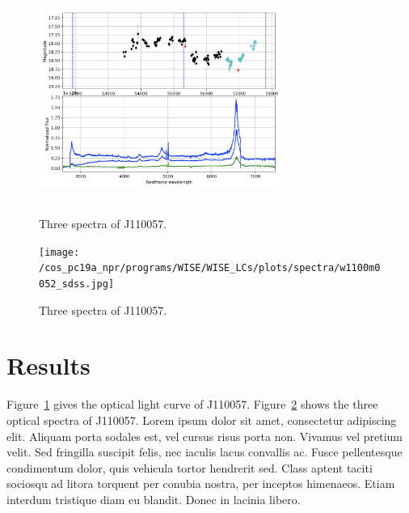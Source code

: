 \documentclass{nature}
\begin{document}
\begin{figure}
  \centering
  \includegraphics[width=8.00cm, height=7.50cm, trim=0.0cm 0.0cm 0.0cm 0.0cm, clip] {J110057_CRTS_lightcurve_v0pnt1.png}
  \caption[]{Three spectra of J110057. }
  \label{fig:J110057_LC_CRTS}
\end{figure}
\begin{figure}
  \texttt{[image: /cos\_pc19a\_npr/programs/WISE/WISE\_LCs/plots/spectra/w1100m0052\_sdss.jpg]}
  \centering
  \caption[]{Three spectra of J110057. }
  \label{fig:J110057_spectra}
\end{figure}
\section{Results}  
Figure~\ref{fig:J110057_LC_CRTS} gives the optical light curve of
J110057.  Figure~\ref{fig:J110057_spectra} shows the three optical
spectra of J110057.  Lorem ipsum dolor sit amet, consectetur
adipiscing elit. Aliquam porta sodales est, vel cursus risus porta
non. Vivamus vel pretium velit. Sed fringilla suscipit felis, nec
iaculis lacus convallis ac. Fusce pellentesque condimentum dolor, quis
vehicula tortor hendrerit sed. Class aptent taciti sociosqu ad litora
torquent per conubia nostra, per inceptos himenaeos. Etiam interdum
tristique diam eu blandit. Donec in lacinia libero.
\end{document}
